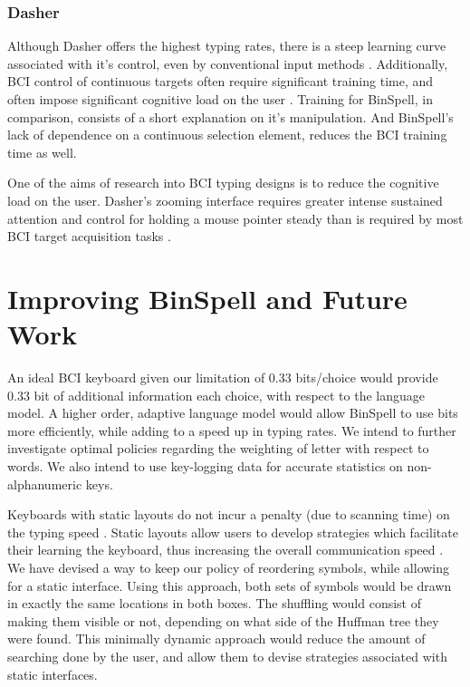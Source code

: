 \documentclass[12pt,titlepage]{article}
\begin{document}
\subsubsection{Dasher}

Although Dasher offers the highest typing rates, there is a steep learning curve associated with 
it's control, even by conventional input methods \cite{felton2007neural}.  Additionally, BCI control of continuous 
targets often require significant training time, and often impose significant cognitive load on 
the user \cite{felton2007neural}.  Training for BinSpell, in comparison, consists of a short explanation on it's 
manipulation.  And BinSpell's lack of dependence on a continuous selection element, reduces 
the BCI training time as well.

One of the aims of research into BCI typing designs is to reduce the cognitive load on the user.  Dasher's zooming interface requires greater intense sustained attention and control for 
holding a mouse pointer steady than is required by most BCI target acquisition tasks \cite{felton2007neural}.

\section{Improving BinSpell and Future Work}

An ideal BCI keyboard given our limitation of 0.33 bits/choice would provide 0.33 bit of 
additional information each choice, with respect to the language model.  A higher order, adaptive 
language model would allow BinSpell to use bits more efficiently, while adding to a speed up in typing 
rates.  We intend to further investigate optimal policies regarding the weighting of letter with respect to words.  We also intend to use key-logging data for accurate statistics on non-alphanumeric keys.  

Keyboards with static layouts do not incur a penalty (due to scanning time) on the typing speed \cite{darragh_reactive_1992}. 
Static layouts allow users to develop strategies which facilitate their learning the keyboard, thus 
increasing the overall communication speed \cite{darragh_reactive_1992}.  We have devised a way to keep our policy of 
reordering symbols, while allowing for a static interface.  Using this approach, both sets of symbols 
would be drawn in exactly the same locations in both boxes.  The  shuffling would consist of making 
them visible or not, depending on what side of the Huffman tree they were found.  This minimally 
dynamic approach would reduce the amount of searching done by the user, and allow them to devise 
strategies associated with static interfaces. 
\end{document}
